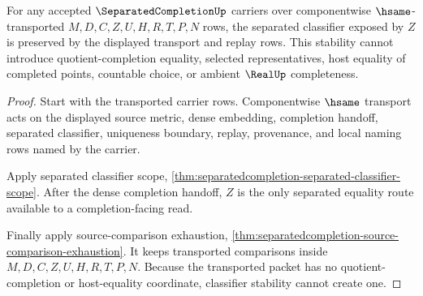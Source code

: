 \begin{theorem}
\label{thm:separated-completion-classifier-stability-root-obligation}
For any accepted $\SeparatedCompletionUp$ carriers over componentwise $\hsame$-transported $M,D,C,Z,U,H,R,T,P,N$ rows, the separated classifier exposed by $Z$ is preserved by the displayed transport and replay rows. This stability cannot introduce quotient-completion equality, selected representatives, host equality of completed points, countable choice, or ambient $\RealUp$ completeness.
\end{theorem}
\begin{proof}
Start with the transported carrier rows. Componentwise $\hsame$ transport acts on the displayed source metric, dense embedding, completion handoff, separated classifier, uniqueness boundary, replay, provenance, and local naming rows named by the carrier.

Apply separated classifier scope, \autoref{thm:separatedcompletion-separated-classifier-scope}. After the dense completion handoff, $Z$ is the only separated equality route available to a completion-facing read.

Finally apply source-comparison exhaustion, \autoref{thm:separatedcompletion-source-comparison-exhaustion}. It keeps transported comparisons inside $M,D,C,Z,U,H,R,T,P,N$. Because the transported packet has no quotient-completion or host-equality coordinate, classifier stability cannot create one.
\end{proof}

